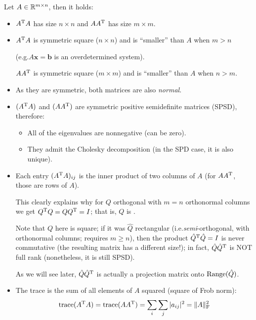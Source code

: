 \documentclass[
  12pt,
  paper=a4,
]{scrartcl} %
\begin{document}
Let $A\in \mathbb R^{m\times n}$, then it holds:
\begin{itemize}
    \item $A^{\mathrm{T}} A$ has size $n \times n$ and $AA^{\mathrm{T}}$ has size $m \times m$.

    \item {} $A^{\mathrm{T}} A$ is symmetric square ($n\times n$) and is ``smaller'' than $A$ when $m>n$
    
    (e.g.\@ $A\bm x=\bm b$ is an overdetermined system).
    
    $AA^{\mathrm{T}}$ is symmetric square ($m\times m$) and is ``smaller'' than $A$ when $n>m$.
    
    \item {} As they are symmetric, both matrices are also \emph{normal}.

    \item {}$(A^{\mathrm{T}} A)$ and $(A A^{\mathrm{T}} )$ are symmetric positive semidefinite matrices (SPSD), therefore:
    \begin{itemize}
        \item All of the eigenvalues are nonnegative (can be zero).
        \item They admit the Cholesky decomposition (in the SPD case, it is also unique).
    \end{itemize}

    \item Each entry $(A^{\mathrm{T}} A)_{ij}$ is the inner product of two columns of $A$ (for $AA^{\mathrm{T}}$, those are rows of $A$). 
    
    This clearly explains why for $Q$ orthogonal with $m=n$ orthonormal columns we get $ Q^{\mathrm{T}} Q=QQ^{\mathrm{T}}=I$; that is, $Q$ is .
    
    Note that $Q$ here is square; if it was $\hat Q$ rectangular (i.e.\@ \emph{semi}-orthogonal, with orthonormal columns; requires $m\ge n$), then the product $\hat Q^{\mathrm{T}} \hat Q = I$ is never commutative (the resulting matrix has a different size!); in fact, $\hat{Q}\hat{Q}^{\mathrm{T}}$ is NOT full rank (nonetheless, it is still SPSD).
    
    As we will see later, $\hat{Q}\hat{Q}^{\mathrm{T}}$ is actually a projection matrix onto $\operatorname{Range}(\hat Q)$.
    \item The trace is the sum of all elements of $A$ squared (square of Frob norm):
    \[ \operatorname{trace}(A^{\mathrm{T}} A) = \operatorname{trace}(A A^{\mathrm{T}}) = \sum_i\sum_j |a_{ij}|^2= \|A\|_{\text{F}}^2\]
    \vspace{-0.55cm}


\end{itemize}
\end{document}
